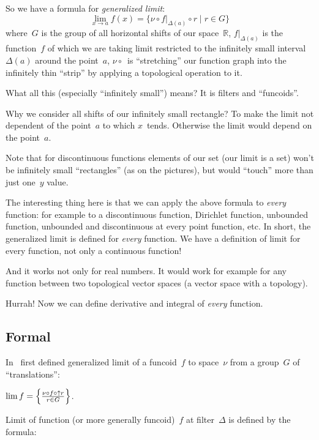 \documentclass{amsart}
\begin{document}
So we have a formula for \emph{generalized limit}:
\[ \lim_{x\to a} f(x) =
\{ \nu \circ f|_{\Delta(a)} \circ r \mid r\in G \} \]
where~$G$ is the group of all horizontal shifts of our space~$\mathbb{R}$, $f|_{\Delta(a)}$ is the function~$f$ of which we are taking limit restricted to the infinitely small interval~$\Delta(a)$ around the point~$a$, $\nu\circ{}$~is ``stretching'' our function graph into the infinitely thin ``strip'' by applying a topological operation to it.

What all this (especially ``infinitely small'') means? It is filters and ``funcoids''.

Why we consider all shifts of our infinitely small rectangle? To make the limit not dependent of the point~$a$ to which $x$~tends. Otherwise the limit would depend on the point~$a$.

Note that for discontinuous functions elements of our set (our limit is a set) won't be infinitely small ``rectangles'' (as on the pictures), but would ``touch'' more than just one~$y$ value.

The interesting thing here is that we can apply the above formula to \emph{every} function: for example to a discontinuous function, Dirichlet function, unbounded function, unbounded and discontinuous at every point function, etc. In short, the generalized limit is defined for \emph{every} function. We have a definition of limit for every function, not only a continuous function!

And it works not only for real numbers. It would work for example for any function between two topological vector spaces (a vector space with a topology).

Hurrah! Now we can define derivative and integral of \emph{every} function.

\subsection{Formal}


In~\cite{volume-1-edition1} first defined generalized limit of
a funcoid~$f$ to space~$\nu$ from a group~$G$ of ``translations'':

\begin{defn}
$\lim f=\left\{ \frac{\nu\circ f\circ\uparrow r}{r\in G}\right\}$.
\end{defn}

Limit of function (or more generally funcoid)~$f$ at filter~$\Delta$ is defined by the formula:
\end{document}
